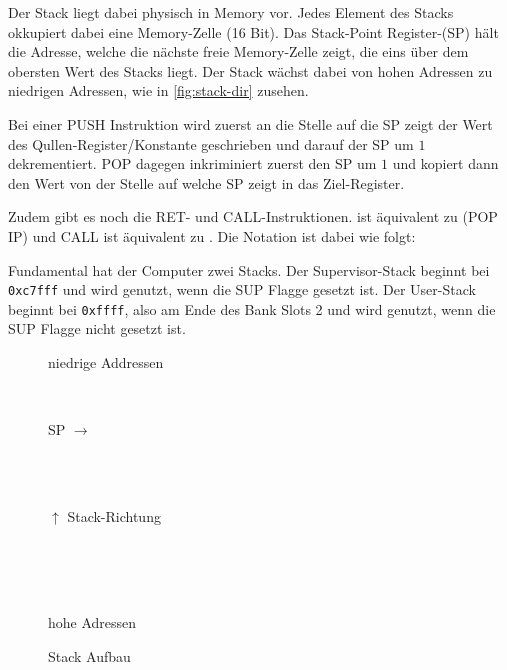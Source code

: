 \documentclass{scrartcl}
\begin{document}

Der Stack liegt dabei physisch in Memory vor. Jedes Element des Stacks okkupiert dabei eine Memory-Zelle (16 Bit). Das Stack-Point Register-(SP) hält die Adresse, welche die nächste freie Memory-Zelle zeigt, die eins über dem obersten Wert des Stacks liegt. Der Stack wächst dabei von hohen Adressen zu niedrigen Adressen, wie in \autoref{fig:stack-dir} zusehen. 

Bei einer PUSH Instruktion wird zuerst an die Stelle auf die SP zeigt der Wert des Qullen-Register/Konstante geschrieben und darauf der SP um $1$ dekrementiert. POP dagegen inkriminiert zuerst den SP um $1$ und kopiert dann den Wert von der Stelle auf welche SP zeigt in das Ziel-Register.

Zudem gibt es noch die RET- und CALL-Instruktionen.  ist äquivalent zu \text(POP IP) und CALL ist äquivalent zu . Die Notation ist dabei wie folgt:



Fundamental hat der Computer zwei Stacks. Der Supervisor-Stack beginnt bei \texttt{0xc7fff} und wird genutzt, wenn die SUP Flagge gesetzt ist. Der User-Stack beginnt bei \texttt{0xffff}, also am Ende des Bank Slots 2 und wird genutzt, wenn die SUP Flagge nicht gesetzt ist.

\begin{figure}[h]
	\centering
	\caption{Stack Aufbau}
	\label{fig:stack-dir}

	\begin{bytefield}[leftcurly=., rightcurly=.]{16}
		\begin{rightwordgroup}{\small niedrige Addressen}
		\end{rightwordgroup} \\
		\begin{leftwordgroup}{\small SP $\rightarrow$}
		\end{leftwordgroup} \\
		 \\
		\begin{rightwordgroup}{\small $\uparrow$ Stack-Richtung}
		\end{rightwordgroup} \\
		 \\
		 \\
		\begin{rightwordgroup}{\small hohe Adressen}
		\end{rightwordgroup}
	\end{bytefield}

\end{figure}
\end{document}
